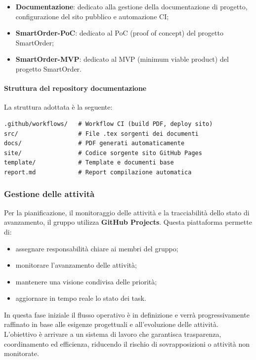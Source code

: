 \documentclass[a4paper, 11pt, oneside]{scrartcl} %
\begin{document}
\begin{itemize}
    \item \textbf{Documentazione}: dedicato alla gestione della documentazione di progetto, configurazione del sito pubblico e automazione CI{\scriptsize{}};
    \item \textbf{SmartOrder-PoC}: dedicato al PoC{\scriptsize{}} (proof of concept) del progetto SmartOrder;
    \item \textbf{SmartOrder-MVP}: dedicato al MVP{\scriptsize{}} (minimum viable product) del progetto SmartOrder.
\end{itemize}


\paragraph{Struttura del repository documentazione}
La struttura adottata è la seguente:

\begin{verbatim}
.github/workflows/   # Workflow CI (build PDF, deploy sito)
src/                 # File .tex sorgenti dei documenti
docs/                # PDF generati automaticamente
site/                # Codice sorgente sito GitHub Pages
template/            # Template e documenti base
report.md            # Report compilazione automatica
\end{verbatim}

\subsubsection{Gestione delle attività}
Per la pianificazione, il monitoraggio delle attività e la tracciabilità dello stato di avanzamento, il gruppo utilizza \textbf{GitHub Projects}{\scriptsize{}}.
Questa piattaforma permette di:

\begin{itemize}
    \item assegnare responsabilità chiare ai membri del gruppo;
    \item monitorare l'avanzamento delle attività;
\item mantenere una visione condivisa delle priorità;
    \item aggiornare in tempo reale lo stato dei task{\scriptsize{}}.
\end{itemize}

In questa fase iniziale il flusso operativo è in definizione e verrà progressivamente raffinato in base alle esigenze progettuali e all’evoluzione delle attività.
L'obiettivo è arrivare a un sistema di lavoro che garantisca trasparenza, coordinamento ed efficienza, riducendo il rischio di sovrapposizioni o attività non monitorate.
\end{document}
